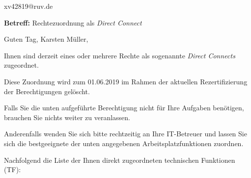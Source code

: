 \documentclass[a4paper,landscape,12pt]{letter}
\begin{document}
\begin{letter}{xv42819@ruv.de\hfill \break}
\begin{normalsize}
	\opening{\textbf{Betreff:} Rechtezuordnung als \emph{Direct Connect}}
	\begin{normalsize} \hfill
	\end{normalsize}

	\begin{normalsize}
		Guten Tag, 
	Karsten Müller, \hfill \break
	\end{normalsize}
	\end{normalsize}
	
\begin{normalsize}
	Ihnen sind derzeit eines oder mehrere Rechte als sogenannte \emph{Direct Connects} zugeordnet.
	
	Diese Zuordnung wird zum 01.06.2019 im Rahmen der aktuellen Rezertifizierung der Berechtigungen gelöscht.
	
	Falls Sie die unten aufgeführte Berechtigung nicht für Ihre Aufgaben benötigen, 
	brauchen Sie nichts weiter zu veranlassen.
	
	Anderenfalls wenden Sie sich bitte rechtzeitig an Ihre IT-Betreuer 
	und lassen Sie sich die bestgeeignete der unten angegebenen Arbeitsplatzfunktionen zuordnen.
	\end{normalsize}
	
\begin{normalsize}
	Nachfolgend die Liste der Ihnen direkt zugeordneten technischen Funktionen (TF):


\end{normalsize}
\end{letter}
\end{document}
